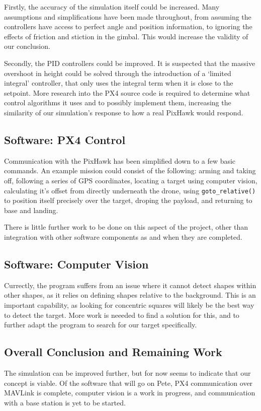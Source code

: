 \documentclass[11pt]{article}
\begin{document}
Firstly, the accuracy of the simulation itself could be increased. Many assumptions and simplifications have been made throughout, from assuming the controllers have access to perfect angle and position information, to ignoring the effects of friction and stiction in the gimbal. This would increase the validity of our conclusion.

Secondly, the PID controllers could be improved. It is suspected that the massive overshoot in height could be solved through the introduction of a `limited integral' controller, that only uses the integral term when it is close to the setpoint. More research into the PX4 source code is required to determine what control algorithms it uses and to possibly implement them, increasing the similarity of our simulation's response to how a real PixHawk would respond.

\subsection{Software: PX4 Control}
Communication with the PixHawk has been simplified down to a few basic commands. An example mission could consist of the following: arming and taking off, following a series of GPS coordinates, locating a target using computer vision, calculating it's offset from directly underneath the drone, using \lstinline|goto_relative()| to position itself precisely over the target, droping the payload, and returning to base and landing.

There is little further work to be done on this aspect of the project, other than integration with other software components as and when they are completed.

\subsection{Software: Computer Vision}
Currectly, the program suffers from an issue where it cannot detect shapes within other shapes, as it relies on defining shapes relative to the background. This is an important capability, as looking for concentric squares will likely be the best way to detect the target. More work is neeeded to find a solution for this, and to further adapt the program to search for our target specifically.

\subsection{Overall Conclusion and Remaining Work}
The simulation can be improved further, but for now seems to indicate that our concept is viable. Of the software that will go on Pete, PX4 communication over MAVLink is complete, computer vision is a work in progress, and communication with a base station is yet to be started.
\end{document}
